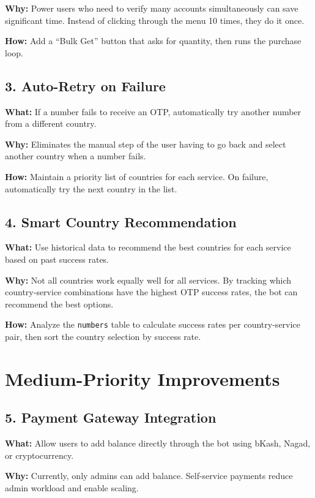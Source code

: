 \textbf{Why:} Power users who need to verify many accounts simultaneously can save significant time. Instead of clicking through the menu 10 times, they do it once.

\textbf{How:} Add a ``Bulk Get'' button that asks for quantity, then runs the purchase loop.

\subsection{3. Auto-Retry on Failure}

\textbf{What:} If a number fails to receive an OTP, automatically try another number from a different country.

\textbf{Why:} Eliminates the manual step of the user having to go back and select another country when a number fails.

\textbf{How:} Maintain a priority list of countries for each service. On failure, automatically try the next country in the list.

\subsection{4. Smart Country Recommendation}

\textbf{What:} Use historical data to recommend the best countries for each service based on past success rates.

\textbf{Why:} Not all countries work equally well for all services. By tracking which country-service combinations have the highest OTP success rates, the bot can recommend the best options.

\textbf{How:} Analyze the \texttt{numbers} table to calculate success rates per country-service pair, then sort the country selection by success rate.

\section{Medium-Priority Improvements}

\subsection{5. Payment Gateway Integration}

\textbf{What:} Allow users to add balance directly through the bot using bKash, Nagad, or cryptocurrency.

\textbf{Why:} Currently, only admins can add balance. Self-service payments reduce admin workload and enable scaling.

